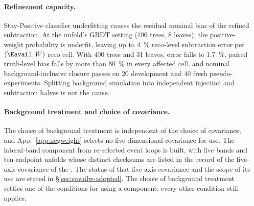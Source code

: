 \paragraph{Refinement capacity.} Stay-Positive classifier underfitting causes the residual nominal bias of the refined subtraction. At the unfold's GBDT setting (100 trees, 8 leaves), the positive-weight probability is underfit, leaving up to \SI{4}{\percent} reco-level subtraction error per $(\Eavail,W)$ reco cell. With 400 trees and 31 leaves, error falls to \SI{1.7}{\percent}, paired truth-level bias falls by more than \SI{80}{\percent} in every affected cell, and nominal background-inclusive closure passes on 20 development and 40 fresh pseudo-experiments. Splitting background simulation into independent injection and subtraction halves is not the cause.
\paragraph{Background treatment and choice of covariance.} The choice of background treatment is independent of the choice of covariance, and App.~\ref{app:negweight} selects no five-dimensional covariance for use. The lateral-band component from re-selected event loops is built, with five bands and ten endpoint unfolds whose distinct checksums are listed in the record of the five-axis covariance of the \resFiveAxis{}. The status of that five-axis covariance and the scope of its use are stated in \S\ref{sec:eavailw-adopted}. The choice of background treatment settles one of the conditions for using a component; every other condition still applies.

